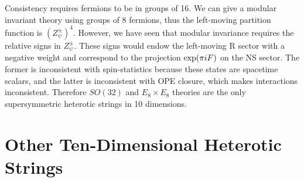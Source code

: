 Consistency requires fermions to be in groups of 16. We can give a modular invariant theory using groups of 8 fermions, thus the left-moving partition function is $(Z_{\psi}^{\pm})^{4}$. However, we have seen that modular invariance requires the relative signs in $Z_{\psi}^{\pm}$. These signs would endow the left-moving R sector with a negative weight and correspond to the projection $\exp(\pi i F)$ on the NS sector. The former is inconsistent with spin-statistics because these states are spacetime scalars, and the latter is inconsistent with OPE closure, which makes interactions inconsistent. Therefore $SO(32)$ and $E_{8}\times E_{8}$ theories are the only supersymmetric heterotic strings in 10 dimensions.

\section{Other Ten-Dimensional Heterotic Strings} \label{sec:11.3}

